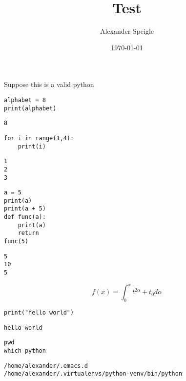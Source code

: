 \documentclass[a4, 12pt]{article}
\author{Alexander Speigle}
\date{\today}
\title{Test}
\begin{document}
\maketitle
\tableofcontents

Suppose this is a valid python 
\begin{verbatim}
alphabet = 8
print(alphabet)
\end{verbatim}

\begin{verbatim}
8
\end{verbatim}


\begin{verbatim}
for i in range(1,4):
    print(i) 
\end{verbatim}

\begin{verbatim}
1
2
3
\end{verbatim}


\begin{verbatim}
a = 5
print(a)
print(a + 5)
def func(a):
    print(a)
    return
func(5)
\end{verbatim}

\begin{verbatim}
5
10
5
\end{verbatim}


\[f(x) = \int_0^x t^{2\alpha} + t_0 d\alpha\]

\begin{verbatim}
print("hello world")
\end{verbatim}

\begin{verbatim}
hello world
\end{verbatim}


\begin{verbatim}
pwd
which python
\end{verbatim}

\begin{verbatim}
/home/alexander/.emacs.d
/home/alexander/.virtualenvs/python-venv/bin/python
\end{verbatim}
\end{document}
